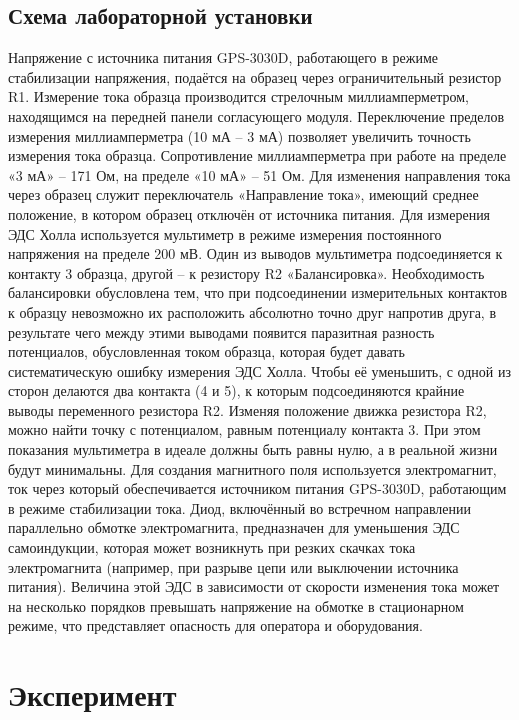 \documentclass[a4paper,14pt]{extarticle}
\begin{document}
\subsection*{Схема лабораторной установки}
Напряжение с источника питания GPS-3030D, работающего в режиме стабилизации напряжения, подаётся на образец через ограничительный резистор R1. Измерение тока образца производится стрелочным миллиамперметром, находящимся на передней панели согласующего модуля. Переключение пределов измерения миллиамперметра (10 мА – 3 мА) позволяет увеличить точность измерения тока образца. Сопротивление миллиамперметра при работе на пределе «3 мА» – 171 Ом, на пределе «10 мА» – 51 Ом. Для изменения направления тока через образец служит переключатель «Направление тока», имеющий среднее положение, в котором образец отключён от источника питания.
Для измерения ЭДС Холла используется мультиметр в режиме измерения постоянного напряжения на пределе 200 мВ. Один из выводов мультиметра подсоединяется к контакту 3 образца, другой – к резистору R2 «Балансировка». Необходимость балансировки обусловлена тем, что при подсоединении измерительных контактов к образцу невозможно их расположить абсолютно точно друг напротив друга, в результате чего между этими выводами появится паразитная разность потенциалов, обусловленная током образца, которая будет давать систематическую ошибку измерения ЭДС Холла. Чтобы её уменьшить, с одной из сторон делаются два контакта (4 и 5), к которым подсоединяются крайние выводы переменного резистора R2. Изменяя положение движка резистора R2, можно найти точку с потенциалом, равным потенциалу контакта 3. При этом показания мультиметра в идеале должны быть равны нулю, а в реальной жизни будут минимальны.
Для создания магнитного поля используется электромагнит, ток через который обеспечивается источником питания GPS-3030D, работающим в режиме стабилизации тока. Диод, включённый во встречном направлении параллельно обмотке электромагнита, предназначен для уменьшения ЭДС самоиндукции, которая может возникнуть при резких скачках тока электромагнита (например, при разрыве цепи или выключении источника питания). Величина этой ЭДС в зависимости от скорости изменения тока может на несколько порядков превышать напряжение на обмотке в стационарном режиме, что представляет опасность для оператора и оборудования.

\newpage
\section{Эксперимент}
\end{document}
